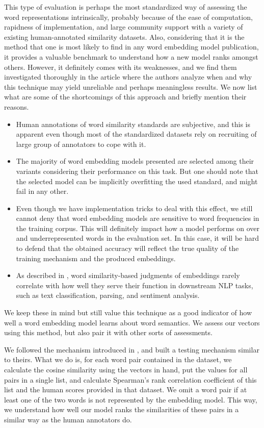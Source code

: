 This type of evaluation is perhaps the most standardized way of assessing the word representations intrinsically, probably because of the ease of computation, rapidness of implementation, and large community support with a variety of existing human-annotated similarity datasets. Also, considering that it is the method that one is most likely to find in any word embedding model publication, it provides a valuable benchmark to understand how a new model ranks amongst others. However, it definitely comes with its weaknesses, and we find them investigated thoroughly in the article \cite{sim-problems} where the authors analyze when and why this technique may yield unreliable and perhaps meaningless results. We now list what are some of the shortcomings of this approach and briefly mention their reasons. 

\begin{itemize}
    \item Human annotations of word similarity standards are subjective, and this is apparent even though most of the standardized datasets rely on recruiting of large group of annotators to cope with it.
    \item The majority of word embedding models presented are selected among their variants considering their performance on this task. But one should note that the selected model can be implicitly overfitting the used standard, and might fail in any other. 
    \item Even though we have implementation tricks to deal with this effect, we still cannot deny that word embedding models are sensitive to word frequencies in the training corpus. This will definitely impact how a model performs on over and underrepresented words in the evaluation set. In this case, it will be hard to defend that the obtained accuracy will reflect the true quality of the training mechanism and the produced embeddings.
    \item As described in \cite{sim-problems2}, word similarity-based judgments of embeddings rarely correlate with how well they serve their function in downstream \ac{NLP} tasks, such as text classification, parsing, and sentiment analysis.
\end{itemize}

We keep these in mind but still value this technique as a good indicator of how well a word embedding model learns about word semantics. We assess our vectors using this method, but also pair it with other sorts of assessments.

We followed the mechanism introduced in \cite{glove}, and built a testing mechanism similar to theirs. What we do is, for each word pair contained in the dataset, we calculate the cosine similarity using the vectors in hand, put the values for all pairs in a single list, and calculate Spearman's rank correlation coefficient of this list and the human scores provided in that dataset. We omit a word pair if at least one of the two words is not represented by the embedding model. This way, we understand how well our model ranks the similarities of these pairs in a similar way as the human annotators do.

